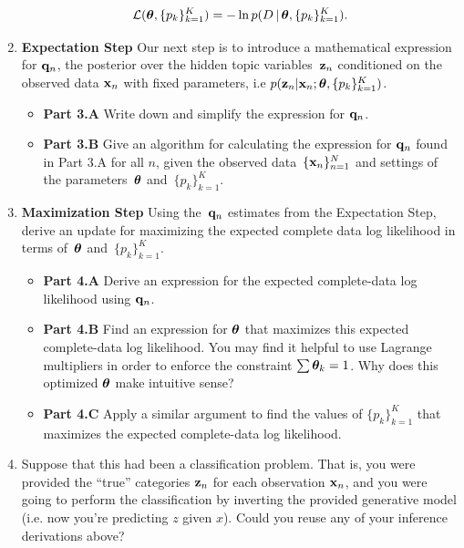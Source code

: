 \documentclass[submit]{harvardml}
\begin{document}
\begin{problem}
\begin{enumerate}
\[\mathcal{L}(\boldsymbol{\theta}, \{p_k\}^K_{k=1}) =  -\ln p(D \,|\,\boldsymbol{\theta}, \{p_k\}^K_{k=1}).\]


\item \textbf{Expectation Step} Our next step is to introduce a
  mathematical expression for $\mathbf{q}_n$, the posterior over the
  hidden topic variables~$\mathbf{z}_n$ conditioned on the observed data
  $\mathbf{x}_n$ with fixed parameters, i.e $p(\mathbf{z}_n | \mathbf{x}_n;
  \boldsymbol{\theta}, \{ p_k \}^K_{k=1})$.

\begin{itemize}
\item  \textbf{Part 3.A } Write down and simplify the expression for $\mathbf{q}_n$.
\item  \textbf{Part 3.B } Give an algorithm for calculating the expression for $\mathbf{q}_n$ found in Part 3.A for all $n$, given the observed data~$\{\mathbf{x}_n\}^N_{n=1}$ and settings of the parameters~$\boldsymbol{\theta}$ and~$\{ p_k\}^K_{k=1}$.

\end{itemize}

\item \textbf{Maximization Step}
Using the~$\mathbf{q}_n$ estimates from the Expectation Step, derive an update for maximizing the expected complete data log likelihood in terms of~$\boldsymbol{\theta}$ and~$\{ p_k \}^K_{k=1}$.

\begin{itemize}
    \item \textbf{Part 4.A } Derive an expression for the expected complete-data log likelihood using $\mathbf{q}_n$.
    \item \textbf{Part 4.B } Find an expression for $\boldsymbol{\theta}$ that maximizes this expected complete-data log likelihood. You may find it helpful to use Lagrange multipliers in order to enforce the constraint $\sum \boldsymbol{\theta}_k = 1$. Why does this optimized $\boldsymbol{\theta}$ make intuitive sense?
    \item \textbf{Part 4.C } Apply a similar argument to find the
      values of $\{p_k \}^K_{k = 1}$ that maximizes the expected
      complete-data log likelihood.
\end{itemize}

\item Suppose that this had been a classification problem. That is,
  you were provided the ``true'' categories $\mathbf{z}_n$ for each observation $\mathbf{x}_n$,
  and you were going to perform the classification by
  inverting the provided generative model (i.e. now you're predicting $z$ given $x$). Could you reuse any of
  your inference derivations above?


\end{enumerate}
\end{problem}
\end{document}
